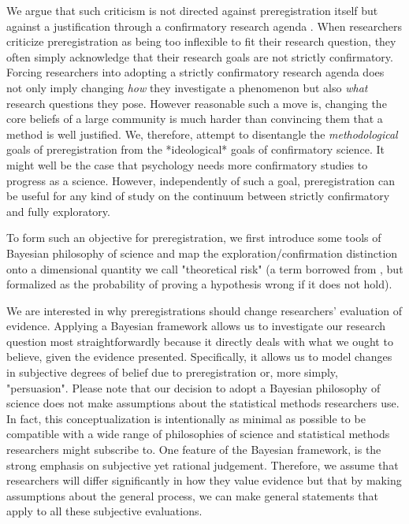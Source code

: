\documentclass[jou,a4paper]{apa7}
\begin{document}
We argue that such criticism is not directed against preregistration itself but against a justification through a confirmatory research agenda \parencite{wagenmakersAgendaPurelyConfirmatory2012}.
When researchers criticize preregistration as being too inflexible to fit their research question, they often simply acknowledge that their research goals are not strictly confirmatory. Forcing researchers into adopting a strictly confirmatory research agenda does not only imply changing \textit{how} they investigate a phenomenon but also \textit{what} research questions they pose. However reasonable such a move is, changing the core beliefs of a large community is much harder than convincing them that a method is well justified. We, therefore, attempt to disentangle the \textit{methodological} goals of preregistration from the *ideological* goals of confirmatory science. It might well be the case that psychology needs more confirmatory studies to progress as a science. However, independently of such a goal, preregistration can be useful for any kind of study on the continuum between strictly confirmatory and fully exploratory.\par
To form such an objective for preregistration, we first introduce some tools of Bayesian philosophy of science and map the exploration/confirmation distinction onto a dimensional quantity we call "theoretical risk" (a term borrowed from \cite{meehlTheoreticalRisksTabular1978}, but formalized as the probability of proving a hypothesis wrong if it does not hold).\par
We are interested in why preregistrations should change researchers' evaluation of evidence. Applying a Bayesian framework allows us to investigate our research question most straightforwardly because it directly deals with what we ought to believe, given the evidence presented.
Specifically, it allows us to model changes in subjective degrees of belief due to preregistration or, more simply, "persuasion". Please note that our decision to adopt a Bayesian philosophy of science does not make assumptions about the statistical methods researchers use.
In fact, this conceptualization is intentionally as minimal as possible to be compatible with a wide range of philosophies of science and statistical methods researchers might subscribe to. One feature of the Bayesian framework, is the strong emphasis on subjective yet rational judgement.
Therefore, we assume that researchers will differ significantly in how they value evidence but that by making assumptions about the general process, we can make general statements that apply to all these subjective evaluations.
\end{document}
